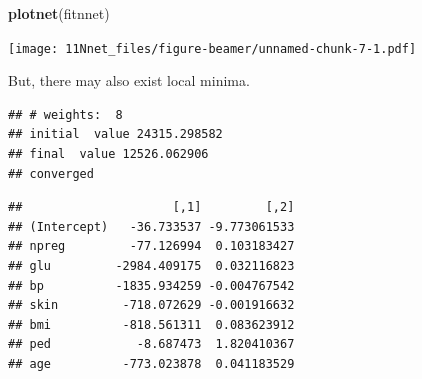 \documentclass[10pt,ignorenonframetext,]{beamer}
\newenvironment{Shaded}{\begin{snugshade}}{\end{snugshade}}
\newcommand{\KeywordTok}[1]{\textcolor[rgb]{0.13,0.29,0.53}{\textbf{#1}}}
\newcommand{\DataTypeTok}[1]{\textcolor[rgb]{0.13,0.29,0.53}{#1}}
\newcommand{\DecValTok}[1]{\textcolor[rgb]{0.00,0.00,0.81}{#1}}
\newcommand{\StringTok}[1]{\textcolor[rgb]{0.31,0.60,0.02}{#1}}
\newcommand{\OtherTok}[1]{\textcolor[rgb]{0.56,0.35,0.01}{#1}}
\newcommand{\OperatorTok}[1]{\textcolor[rgb]{0.81,0.36,0.00}{\textbf{#1}}}
\newcommand{\NormalTok}[1]{#1}
\begin{document}
\begin{frame}[fragile]

\begin{Shaded}
\begin{Highlighting}[]
\KeywordTok{plotnet}\NormalTok{(fitnnet)}
\end{Highlighting}
\end{Shaded}

\texttt{[image: 11Nnet\_files/figure-beamer/unnamed-chunk-7-1.pdf]}

\end{frame}

\begin{frame}[fragile]

But, there may also exist local minima.

\begin{Shaded}
\end{Shaded}

\begin{verbatim}
## # weights:  8
## initial  value 24315.298582 
## final  value 12526.062906 
## converged
\end{verbatim}

\begin{Shaded}
\end{Shaded}

\begin{verbatim}
##                     [,1]         [,2]
## (Intercept)   -36.733537 -9.773061533
## npreg         -77.126994  0.103183427
## glu         -2984.409175  0.032116823
## bp          -1835.934259 -0.004767542
## skin         -718.072629 -0.001916632
## bmi          -818.561311  0.083623912
## ped            -8.687473  1.820410367
## age          -773.023878  0.041183529
\end{verbatim}

\end{frame}
\end{document}
